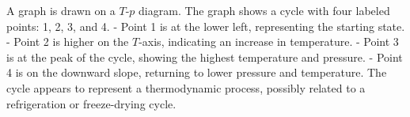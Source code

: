 A graph is drawn on a \( T \)-\( p \) diagram. The graph shows a cycle with four labeled points: 1, 2, 3, and 4.  
- Point 1 is at the lower left, representing the starting state.  
- Point 2 is higher on the \( T \)-axis, indicating an increase in temperature.  
- Point 3 is at the peak of the cycle, showing the highest temperature and pressure.  
- Point 4 is on the downward slope, returning to lower pressure and temperature.  
The cycle appears to represent a thermodynamic process, possibly related to a refrigeration or freeze-drying cycle.